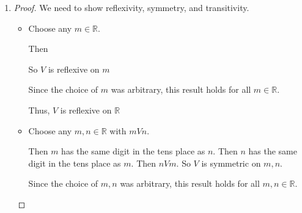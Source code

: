 \documentclass[12pt,letterpaper]{article}
\begin{document}
\begin{enumerate}
\begin{enumerate}
\begin{enumerate}
\begin{proof}
\begin{itemize}
                    Since the choice of $m, n, p$ was arbitrary,
                    this result holds for all $m, n, p \in \mathbb{N}$.

                    Thus, $R$ is transitive on $\mathbb{N}$
                \end{itemize}
              \end{proof}

              An element of $106 / R$ less than $50$ is $3$,
              since the tens place of 106 is 0, the tens place of 3 is 0, and $3 < 50$.

              An element of $106 / R$ between $150$ and $300$ is $203$,
              since the tens place of 106 is 0, the tens place of 203 is 0, and $150 < 203 < 300$.

              An element of $106 / R$ greater than $1000$ is $2003$,
              since the tens place of 106 is 0, the tens place of 2003 is 0, and $1000 < 2003$.

              Three elements of $635 / R$ are $30, 31$, and $32$,
              since the tens place of 635 is 3, the tens place of 30 is 3, the tens place of 31 is 3, and the tens place of 32 is 3.
            \item
              \begin{proof}
                We need to show reflexivity, symmetry, and transitivity.

                \begin{itemize}
                  \item
                    Choose any $m \in \mathbb{R}$.

                    Then

                    So $V$ is reflexive on $m$

                    Since the choice of $m$ was arbitrary,
                    this result holds for all $m \in \mathbb{R}$.

                    Thus, $V$ is reflexive on $\mathbb{R}$
                  \item
                    Choose any $m, n \in \mathbb{R}$ with $m V n$.

                    Then $m$ has the same digit in the tens place as $n$.
                    Then $n$ has the same digit in the tens place as $m$.
                    Then $n V m$.
                    So $V$ is symmetric on $m, n$.

                    Since the choice of $m, n$ was arbitrary,
                    this result holds for all $m, n \in \mathbb{R}$.


\end{itemize}
\end{proof}
\end{enumerate}
\end{enumerate}
\end{enumerate}
\end{document}
